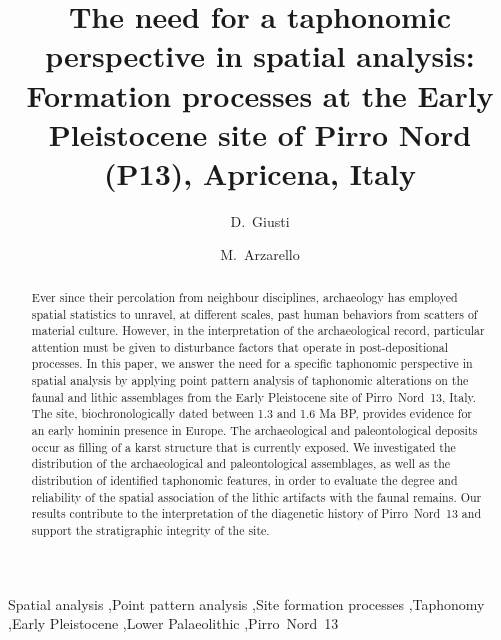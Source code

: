 \documentclass[review,authoryear]{elsarticle} %
\begin{document}
\begin{frontmatter}
  
  \title{The need for a taphonomic perspective in spatial analysis: Formation processes at the Early Pleistocene site of Pirro Nord (P13), Apricena, Italy}
  
  \author[tue]{D.~Giusti}
  
  \author[fe]{M.~Arzarello}
  
  \address[tue]{Paläoanthropologie, Senckenberg Center for Human Evolution and Paleoecology, Eberhard Karls Universität Tübingen, Rümelinstr. 23, 72070 Tübingen, Germany}
  \address[fe]{Dipartimento di Studi Umanistici, Università degli Studi di Ferrara, C.so Ercole I d'Este 32, 44100 Ferrara, Italy}

  \begin{abstract}
Ever since their percolation from neighbour disciplines, archaeology has employed spatial statistics to unravel, at different scales, past human behaviors from scatters of material culture. However, in the interpretation of the archaeological record, particular attention must be given to disturbance factors that operate in post-depositional processes. In this paper, we answer the need for a specific taphonomic perspective in spatial analysis by applying point pattern analysis of taphonomic alterations on the faunal and lithic assemblages from the Early Pleistocene site of Pirro~Nord~13, Italy. The site, biochronologically dated between 1.3 and 1.6 Ma BP, provides evidence for an early hominin presence in Europe. The archaeological and paleontological deposits occur as filling of a karst structure that is currently exposed. We investigated the distribution of the archaeological and paleontological assemblages, as well as the distribution of identified taphonomic features, in order to evaluate the degree and reliability of the spatial association of the lithic artifacts with the faunal remains. Our results contribute to the interpretation of the diagenetic history of Pirro~Nord~13 and support the stratigraphic integrity of the site.
  \end{abstract}

  \begin{keyword}
    Spatial analysis \sep Point pattern analysis \sep Site formation processes \sep Taphonomy \sep Early Pleistocene \sep Lower Palaeolithic \sep Pirro~Nord~13
  \end{keyword}
  
\end{frontmatter}
\end{document}
